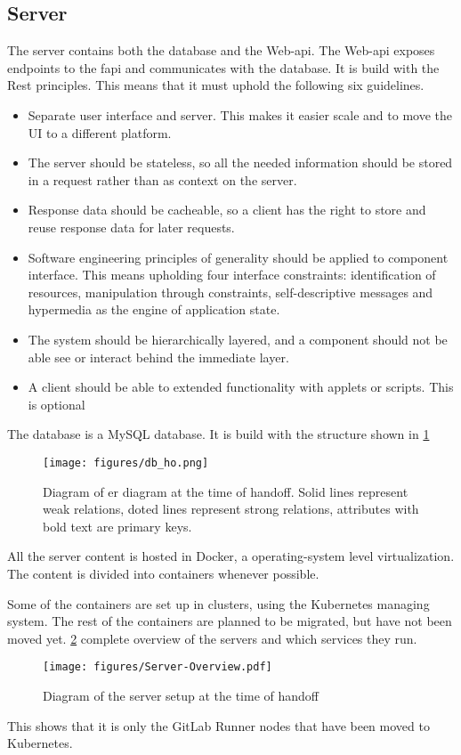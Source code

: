 \subsection{Server}
The server contains both the database and the Web-api. The Web-api exposes endpoints to the \gls{fapi} and communicates with the database. It is build with the Rest principles. This means that it must uphold the following six guidelines\cite{REST}. 
\begin{itemize}
    \item Separate user interface and server. This makes it easier scale and to move the UI to a different platform.
    \item The server should be stateless, so all the needed information should be stored in a request rather than as context on the server.
    \item Response data should be cacheable, so a client has the right to store and reuse response data for later requests. 
    \item Software engineering principles of generality should be applied to component interface. This means upholding four interface constraints: identification of resources, manipulation through constraints, self-descriptive messages and hypermedia as the engine of application state. 
    \item The system should be hierarchically layered, and a component should not be able see or interact behind the immediate layer.
    \item A client should be able to extended functionality with applets or scripts. This is optional
\end{itemize}

The database is a MySQL database. It is build with the structure shown in \ref{fig:state-at-handoff:db}

\begin{figure}[ht]
    \centering
    \caption{Diagram of \gls{er} diagram at the time of handoff. Solid lines represent weak relations, doted lines represent strong relations, attributes with bold text are primary keys.}
    \texttt{[image: figures/db\_ho.png]}
    \label{fig:state-at-handoff:db}
\end{figure}

All the server content is hosted in Docker, a operating-system level virtualization. The content is divided into containers whenever possible. 

Some of the containers are set up in clusters, using the Kubernetes managing system. The rest of the containers are planned to be migrated, but have not been moved yet. \ref{fig:state-at-handoff:server} complete overview of the servers and which services they run.

\begin{figure}[h]
    \centering
    \caption{Diagram of the server setup at the time of handoff\cite[p.~74]{SW611F18}}
    \texttt{[image: figures/Server-Overview.pdf]}
    \label{fig:state-at-handoff:server}
\end{figure}

This shows that it is only the GitLab Runner nodes that have been moved to Kubernetes. 




